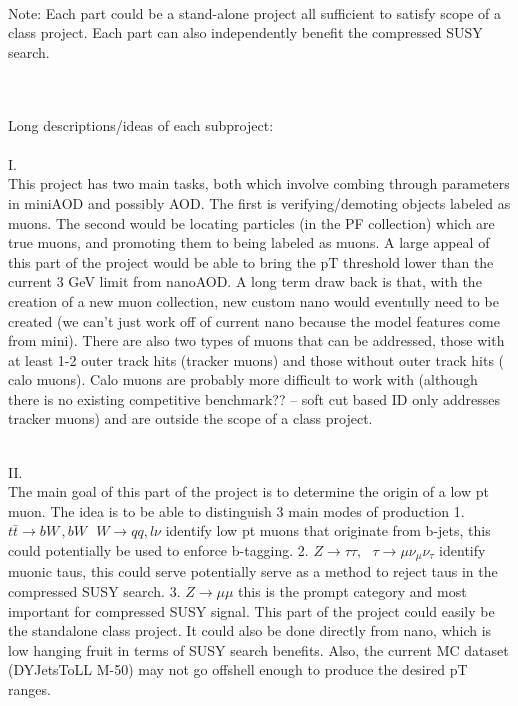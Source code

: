 \documentclass[10pt,a4paper]{article}
\begin{document}
 \quad \quad \\
Note: Each part could be a stand-alone project all sufficient to satisfy scope of a class project. Each part can also independently benefit the compressed SUSY search.

\quad \quad \\
\quad \quad \\
Long descriptions/ideas of each subproject:\\
\quad \quad \\
I.\\
This project has two main tasks, both which involve combing through parameters in miniAOD and possibly AOD. The first is verifying/demoting objects labeled as muons. The second would be locating particles (in the PF collection) which are true muons, and promoting them to being labeled as muons. A large appeal of this part of the project would be able to bring the pT threshold lower than the current 3 GeV limit from nanoAOD. A long term draw back is that, with the creation of a new muon collection, new custom nano would eventully need to be created (we can't just work off of current nano because the model features come from mini).  There are also two types of muons that can be addressed, those with at least 1-2 outer track hits (tracker muons) and those without outer track hits ( calo muons). Calo muons are probably more difficult to work with (although there is no existing competitive benchmark?? -- soft cut based ID only addresses tracker muons) and are outside the scope of a class project. 


\quad \quad \\
II.\\
The main goal of this part of the project is to determine the origin of a low pt muon. The idea is to be able to distinguish 3 main modes of production 1. $t\bar{t} \rightarrow bW\,, bW \, \, \, \, W\rightarrow qq, l\nu$ identify low pt muons that originate from b-jets, this could potentially be used to enforce b-tagging. 2. $Z\rightarrow \tau\tau, \,\,\, \, \tau\rightarrow\mu\nu_\mu\nu_\tau$ identify muonic taus, this could serve potentially serve as a method to reject taus in the compressed SUSY search. 3. $Z\rightarrow \mu\mu$ this is the prompt category and most important for compressed SUSY signal. This part of the project could easily be the standalone class project. It could also be done directly from nano, which is low hanging fruit in terms of SUSY search benefits. Also, the current MC dataset (DYJetsToLL M-50) may not go offshell enough to produce the desired pT ranges.
\end{document}

